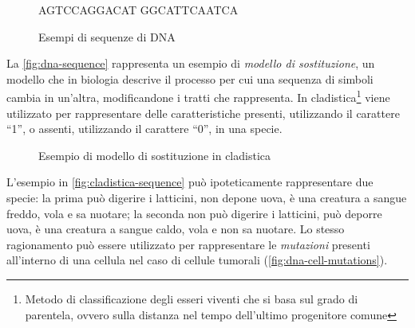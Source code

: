 \begin{figure}[h]
    \centering
    AGTCCAGGACAT \qquad GGCATTCAATCA
    \caption{Esempi di sequenze di DNA}
    \label{fig:dna-sequence}
\end{figure}

La \autoref{fig:dna-sequence} rappresenta un esempio di \textit{modello di sostituzione}, un modello che in biologia descrive il processo per cui una sequenza di simboli cambia in un'altra, modificandone i tratti che rappresenta. In cladistica\footnote{Metodo di classificazione degli esseri viventi che si basa sul grado di parentela, ovvero sulla distanza nel tempo dell'ultimo progenitore comune} viene utilizzato per rappresentare delle caratteristiche presenti, utilizzando il carattere ``1'', o assenti, utilizzando il carattere ``0'', in una specie.

\begin{figure}[h]
     
    \caption{Esempio di modello di sostituzione in cladistica}
    \label{fig:cladistica-sequence}
\end{figure}

L'esempio in \autoref{fig:cladistica-sequence} può ipoteticamente rappresentare due specie: la prima può digerire i latticini, non depone uova, è una creatura a sangue freddo, vola e sa nuotare; la seconda non può digerire i latticini, può deporre uova, è una creatura a sangue caldo, vola e non sa nuotare. Lo stesso ragionamento può essere utilizzato per rappresentare le \textit{mutazioni} presenti all'interno di una cellula nel caso di cellule tumorali (\autoref{fig:dna-cell-mutations}).

